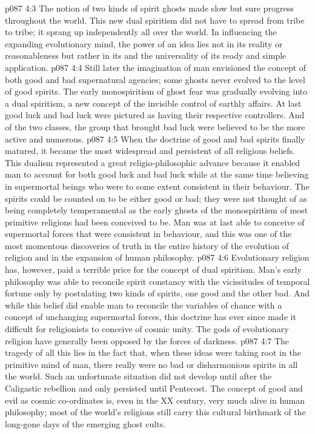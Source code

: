 \vs p087 4:3 The notion of two kinds of spirit ghosts made slow but sure progress throughout the world. This new dual spiritism did not have to spread from tribe to tribe; it sprang up independently all over the world. In influencing the expanding evolutionary mind, the power of an idea lies not in its reality or reasonableness but rather in its  and the universality of its ready and simple application.
\vs p087 4:4 Still later the imagination of man envisioned the concept of both good and bad supernatural agencies; some ghosts never evolved to the level of good spirits. The early monospiritism of ghost fear was gradually evolving into a dual spiritism, a new concept of the invisible control of earthly affairs. At last good luck and bad luck were pictured as having their respective controllers. And of the two classes, the group that brought bad luck were believed to be the more active and numerous.
\vs p087 4:5 \pc When the doctrine of good and bad spirits finally matured, it became the most widespread and persistent of all religious beliefs. This dualism represented a great religio\hyp{}philosophic advance because it enabled man to account for both good luck and bad luck while at the same time believing in supermortal beings who were to some extent consistent in their behaviour. The spirits could be counted on to be either good or bad; they were not thought of as being completely temperamental as the early ghosts of the monospiritism of most primitive religions had been conceived to be. Man was at last able to conceive of supermortal forces that were consistent in behaviour, and this was one of the most momentous discoveries of truth in the entire history of the evolution of religion and in the expansion of human philosophy.
\vs p087 4:6 Evolutionary religion has, however, paid a terrible price for the concept of dual spiritism. Man’s early philosophy was able to reconcile spirit constancy with the vicissitudes of temporal fortune only by postulating two kinds of spirits, one good and the other bad. And while this belief did enable man to reconcile the variables of chance with a concept of unchanging supermortal forces, this doctrine has ever since made it difficult for religionists to conceive of cosmic unity. The gods of evolutionary religion have generally been opposed by the forces of darkness.
\vs p087 4:7 The tragedy of all this lies in the fact that, when these ideas were taking root in the primitive mind of man, there really were no bad or disharmonious spirits in all the world. Such an unfortunate situation did not develop until after the Caligastic rebellion and only persisted until Pentecost. The concept of good and evil as cosmic co\hyp{}ordinates is, even in the XX century, very much alive in human philosophy; most of the world’s religions still carry this cultural birthmark of the long\hyp{}gone days of the emerging ghost cults.
